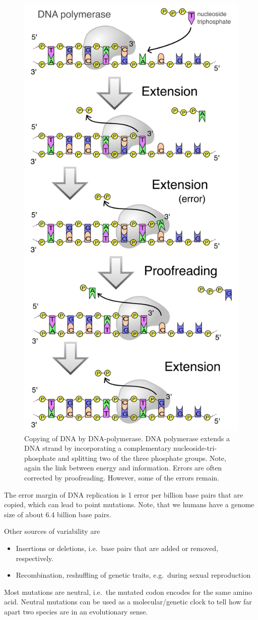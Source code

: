 \documentclass[
  11pt,
]{book}
\providecommand{\tightlist}{%
  \setlength{\itemsep}{0pt}\setlength{\parskip}{0pt}}
\begin{document}
\begin{figure}

{\centering \includegraphics[width=0.45\linewidth]{./figs/DNA_polymerase} 

}

\caption{Copying of DNA by DNA-polymerase. DNA polymerase extends a DNA strand by incorporating a complementary nucleoside-tri-phosphate and splitting two of the three phosphate groups. Note, again the link between energy and information. Errors are often corrected by proofreading. However, some of the errors remain.}\label{fig:dnaPolymerase}
\end{figure}

The error margin of DNA replication is 1 error per billion base pairs that are copied, which can lead to point mutations. Note, that we humans have a genome size of about 6.4 billion base pairs.

Other sources of variability are

\begin{itemize}
\tightlist
\item
  Insertions or deletions, i.e.~base pairs that are added or removed, respectively.
\item
  Recombination, reshuffling of genetic traits, e.g.~during sexual reproduction
\end{itemize}

Most mutations are neutral, i.e.~the mutated codon encodes for the same amino acid. Neutral mutations can be used as a molecular/genetic clock to tell how far apart two species are in an evolutionary sense.
\end{document}
